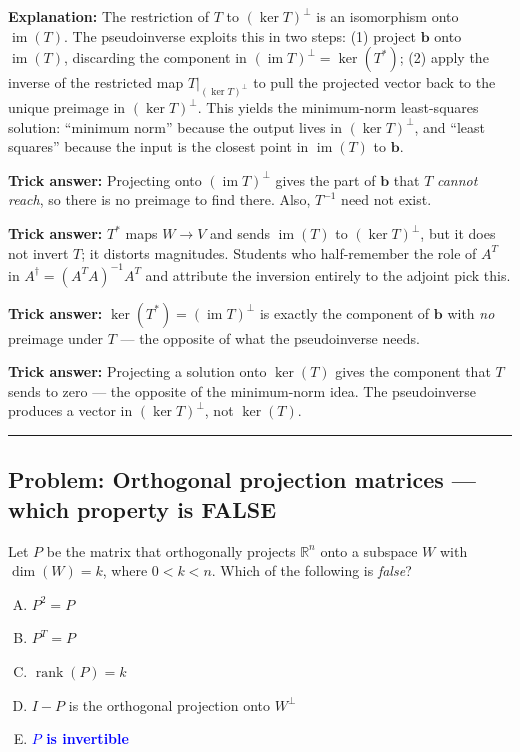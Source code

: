 \documentclass[12pt]{amsart}
\newcommand{\divider}{
  \vspace{-1em}
  \noindent
  \raisebox{-0.15ex}{\textbullet}%
  \hspace{0.5em}%
  \rule[0.5ex]{0.95\textwidth}{1.0pt}%
  \hspace{0.5em}%
  \raisebox{-0.15ex}{\textbullet}%
  \vspace{0em}
}
\begin{document}
\textbf{Explanation:}
The restriction of $T$ to $(\ker T)^\perp$ is an isomorphism onto
$\operatorname{im}(T)$.
The pseudoinverse exploits this in two steps:
(1) project $\mathbf{b}$ onto $\operatorname{im}(T)$, discarding the component in
$(\operatorname{im} T)^\perp = \ker(T^*)$;
(2) apply the inverse of the restricted map $T|_{(\ker T)^\perp}$ to pull the
projected vector back to the unique preimage in $(\ker T)^\perp$.
This yields the minimum-norm least-squares solution: ``minimum norm'' because
the output lives in $(\ker T)^\perp$, and ``least squares'' because the input
is the closest point in $\operatorname{im}(T)$ to $\mathbf{b}$.

\textbf{Trick answer:}
Projecting onto $(\operatorname{im} T)^\perp$ gives the part of $\mathbf{b}$ that $T$
\emph{cannot reach}, so there is no preimage to find there.
Also, $T^{-1}$ need not exist.

\textbf{Trick answer:}
$T^*$ maps $W\to V$ and sends $\operatorname{im}(T)$ to $(\ker T)^\perp$, but it does
not invert $T$; it distorts magnitudes.
Students who half-remember the role of $A^T$ in $A^\dagger = (A^TA)^{-1}A^T$
and attribute the inversion entirely to the adjoint pick this.

\textbf{Trick answer:}
$\ker(T^*) = (\operatorname{im} T)^\perp$ is exactly the component of $\mathbf{b}$ with
\emph{no} preimage under $T$ --- the opposite of what the pseudoinverse needs.

\textbf{Trick answer:}
Projecting a solution onto $\ker(T)$ gives the component that $T$ sends to
zero --- the opposite of the minimum-norm idea.
The pseudoinverse produces a vector in $(\ker T)^\perp$, not $\ker(T)$.

\divider

\subsection*{Problem: Orthogonal projection matrices --- which property is FALSE}

Let $P$ be the matrix that orthogonally projects $\mathbb{R}^n$ onto a subspace
$W$ with $\dim(W) = k$, where $0 < k < n$.
Which of the following is \emph{false}?

\begin{enumerate}[(A)]
\item $P^2 = P$
\item $P^T = P$
\item $\operatorname{rank}(P) = k$
\item $I - P$ is the orthogonal projection onto $W^\perp$
\item \textcolor{blue}{\textbf{$P$ is invertible}}
\end{enumerate}
\end{document}

